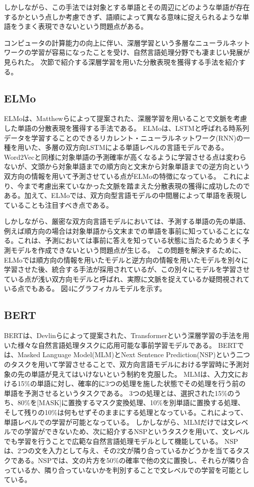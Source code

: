 \documentclass[uplatex]{jsarticle}
\begin{document}
しかしながら、この手法では対象とする単語とその周辺にどのような単語が存在するかという点しか考慮できず、語順によって異なる意味に捉えられるような単語をうまく表現できないという問題点がある。

コンピュータの計算能力の向上に伴い、深層学習という多層なニューラルネットワークの学習が容易になったことを受け、自然言語処理分野でも凄まじい発展が見られた。
次節で紹介する深層学習を用いた分散表現を獲得する手法を紹介する。

\subsection{ELMo}
ELMoは、Matthewら\cite{ELMo}によって提案された、深層学習を用いることで文脈を考慮した単語の分散表現を獲得する手法である。
ELMoは、LSTM\cite{LSTM}と呼ばれる時系列データを学習することのできるリカレント・ニューラルネットワーク(RNN)の一種を用いた、多層の双方向LSTMによる単語レベルの言語モデルである。
Word2Vecと同様に対象単語の予測確率が高くなるように学習させる点は変わらないが、文頭から対象単語までの順方向と文末から対象単語までの逆方向という双方向の情報を用いて予測させている点がELMoの特徴になっている。
これにより、今まで考慮出来ていなかった文脈を踏まえた分散表現の獲得に成功したのである。加えて、ELMoでは、双方向型言語モデルの中間層によって単語を表現していることも注目すべき点である。

しかしながら、厳密な双方向言語モデルにおいては、予測する単語の先の単語、例えば順方向の場合は対象単語から文末までの単語を事前に知っていることになる。これは、予測においては事前に答えを知っている状態に当たるためうまく予測モデルを作成できないという問題点が生じる。
この問題を解決するために、ELMoでは順方向の情報を用いたモデルと逆方向の情報を用いたモデルを別々に学習させた後、統合する手法が採用されているが、この別々にモデルを学習させている点が浅い双方向モデルと呼ばれ、実際に文脈を捉えているか疑問視されている点でもある。
図4にグラフィカルモデルを示す。

\subsection{BERT}
BERTは、Devlinら\cite{BERT}によって提案された、Transformer\cite{Transformer}という深層学習の手法を用いた様々な自然言語処理タスクに応用可能な事前学習モデルである。
BERTでは、Masked Language Model(MLM)とNext Sentence Prediction(NSP)という二つのタスクを用いて学習させることで、双方向言語モデルにおける学習時に予測対象の先の単語が見えてはいけないという制約を克服した。
MLMは、入力文における15\%の単語に対し、確率的に3つの処理を施した状態でその処理を行う前の単語を予測させるというタスクである。
3つの処理とは、選択された15\%のうち、80\%を[MASK]に置換するマスク変換処理、10\%を別単語に置換する処理、そして残りの10\%は何もせずそのままにする処理となっている。これによって、単語レベルでの学習が可能となっている。
しかしながら、MLMだけでは文レベルでの学習ができないため、次に紹介するNSPというタスクを用いて、文レベルでも学習を行うことで広範な自然言語処理モデルとして機能している。
NSPは、2つの文を入力として与え、その2文が隣り合っているかどうかを当てるタスクである。NSPでは、文の片方を50\%の確率で他の文に置換し、それらが隣り合っているか、隣り合っていないかを判別することで文レベルでの学習を可能としている。
\end{document}
